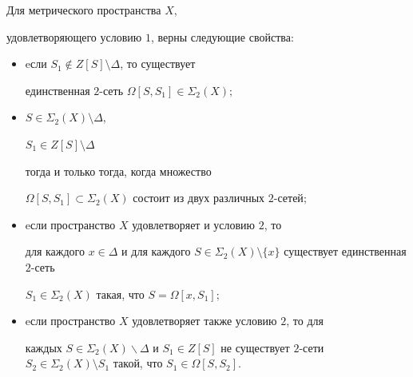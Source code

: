 \begin{thmnonum}


Для метрического пространства $X$,


удовлетворяющего условию $1$, верны следующие свойства\/${:}$


\begin{itemize}


\item[(i)]  eсли $S_{1} \notin Z[S]\setminus \Delta $, то существует


единственная $2$-сеть $\Omega [S,S_{1}]  \in \Sigma_{2}(X);$


\item[(ii)]  $S \in \Sigma_{2}(X) \setminus \Delta $,


$S_{1} \in Z[S]\setminus \Delta$


тогда и только тогда, когда множество


$\Omega [S,S_{1}] \subset


\Sigma_{2} (X)$ состоит из двух различных $2$-сетей$;$


\item[(iii)]  eсли пространство $X$ удовлетворяет и условию $2$, то


для каждого $x \in \Delta $ и для каждого $S \in \Sigma_{2}


(X)\setminus \{x\}$ существует единственная $2$-сеть


$S_{1} \in \Sigma_{2} (X)$ такая, что $S = \Omega [x,S_{1}];$


\item[(iv)]  eсли пространство $X$ удовлетворяет также условию $2$, то для


каждых $S \in \Sigma_{2} (X)\backslash\Delta $ и $S_{1}


\in Z[S]$ не существует $2$-сети  $S_{2} \in


\Sigma_{2}(X)\setminus S_{1}$ такой, что $S_{1} \in \Omega [S,S_{2}]$.


\end{itemize}


\end{thmnonum}






